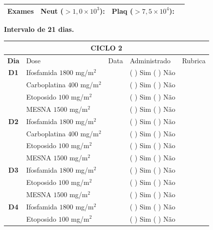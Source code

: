 \documentclass[11pt,a4paper,oldfontcommands]{memoir}
\begin{document}
\begin{center}
\begin{table}[H]
\begin{tabular}{c|p{4cm}|p{1.3cm}|p{3cm}|p{2.7cm}}
    \hline
    \multicolumn{1}{c|}{\multirow{1}{*}{\textbf{Exames}}}&\multicolumn{2}{l|}{Neut (\(>1,0\times10^3\)):}&{Plaq (\(>7,5\times10^4\)):}&{}\\
    \hline
\end{tabular}
\end{table}
\textbf{Intervalo de 21 dias.}
\begin{table}[H]
\begin{tabular}{c|p{4cm}|p{1.3cm}|p{3cm}|p{2.7cm}}
	\hline
	\multicolumn{5}{c}{\textbf{CICLO 2}}\\
\hline
    \multicolumn{1}{c|}{\multirow{1}{*}{\textbf{Dia}}}&{Dose}&{Data}&{Administrado}&{Rubrica} \\
    \hline
    \multicolumn{1}{c|}{\multirow{1}{*}{\textbf{D1}}}&{Ifosfamida \(1800\) mg/m\(^2\)}&&{(  ) Sim (  ) Não}&\\
    \multicolumn{1}{c|}{\multirow{1}{*}{\textbf{}}}&{Carboplatina \(400\) mg/m\(^2\)}&&{(  ) Sim (  ) Não}&\\
    \multicolumn{1}{c|}{\multirow{1}{*}{\textbf{}}}&{Etoposido \(100\) mg/m\(^2\)}&&{(  ) Sim (  ) Não}&\\
    \multicolumn{1}{c|}{\multirow{1}{*}{\textbf{}}}&{MESNA \(1500\) mg/m\(^2\)}&&{(  ) Sim (  ) Não}&\\
    \multicolumn{1}{c|}{\multirow{1}{*}{\textbf{D2}}}&{Ifosfamida \(1800\) mg/m\(^2\)}&&{(  ) Sim (  ) Não}&\\
    \multicolumn{1}{c|}{\multirow{1}{*}{\textbf{}}}&{Carboplatina \(400\) mg/m\(^2\)}&&{(  ) Sim (  ) Não}&\\
    \multicolumn{1}{c|}{\multirow{1}{*}{\textbf{}}}&{Etoposido \(100\) mg/m\(^2\)}&&{(  ) Sim (  ) Não}&\\
    \multicolumn{1}{c|}{\multirow{1}{*}{\textbf{}}}&{MESNA \(1500\) mg/m\(^2\)}&&{(  ) Sim (  ) Não}&\\
    \multicolumn{1}{c|}{\multirow{1}{*}{\textbf{D3}}}&{Ifosfamida \(1800\) mg/m\(^2\)}&&{(  ) Sim (  ) Não}&\\
    \multicolumn{1}{c|}{\multirow{1}{*}{\textbf{}}}&{Etoposido \(100\) mg/m\(^2\)}&&{(  ) Sim (  ) Não}&\\
    \multicolumn{1}{c|}{\multirow{1}{*}{\textbf{}}}&{MESNA \(1500\) mg/m\(^2\)}&&{(  ) Sim (  ) Não}&\\
    \multicolumn{1}{c|}{\multirow{1}{*}{\textbf{D4}}}&{Ifosfamida \(1800\) mg/m\(^2\)}&&{(  ) Sim (  ) Não}&\\
    \multicolumn{1}{c|}{\multirow{1}{*}{\textbf{}}}&{Etoposido \(100\) mg/m\(^2\)}&&{(  ) Sim (  ) Não}&\\

\end{tabular}
\end{table}
\end{center}
\end{document}
